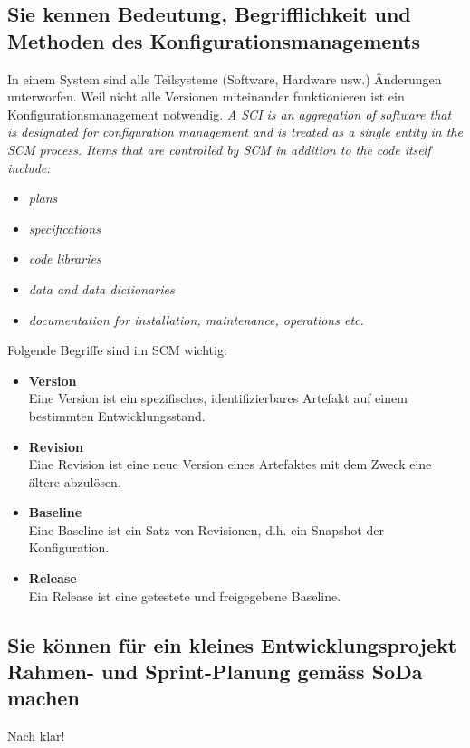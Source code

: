 \subsection{Sie kennen Bedeutung, Begrifflichkeit und Methoden des Konfigurationsmanagements}\label{sec:konfigurationsmanagement}

In einem System sind alle Teilsysteme (Software, Hardware usw.) Änderungen unterworfen. Weil nicht alle Versionen miteinander funktionieren ist ein Konfigurationsmanagement notwendig. \emph{A \ac{SCI} is an aggregation of software that is designated for configuration management and is treated as a single entity in the \ac{SCM} process. Items that are controlled by \ac{SCM} in addition to the code itself include:}

\begin{itemize}
	\item \emph{plans}
	\item \emph{specifications}
	\item \emph{code libraries}
	\item \emph{data and data dictionaries}
	\item \emph{documentation for installation, maintenance, operations etc.}
\end{itemize} 
Folgende Begriffe sind im \ac{SCM} wichtig:
\begin{itemize}
	\item \textbf{Version} \\
		  Eine Version ist ein spezifisches, identifizierbares Artefakt auf einem bestimmten Entwicklungsstand.
	\item \textbf{Revision} \\
		  Eine Revision ist eine neue Version eines Artefaktes mit dem Zweck eine ältere abzulösen.
	\item \textbf{Baseline} \\
		  Eine Baseline ist ein Satz von Revisionen, d.h. ein Snapshot der Konfiguration.
	\item \textbf{Release} \\
		  Ein Release ist eine getestete und freigegebene Baseline.	  
\end{itemize}

\subsection{Sie können für ein kleines Entwicklungsprojekt Rahmen- und Sprint-Planung gemäss SoDa machen}

Nach klar!

